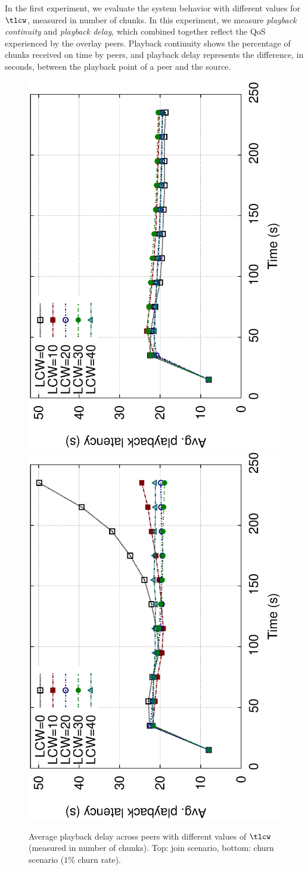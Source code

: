 {In the first experiment, we evaluate the system behavior with different values
for $\tlcw$, measured in number of chunks. In this experiment, we measure {\em
playback continuity} and {\em playback delay}, which combined together reflect
the QoS experienced by the overlay peers. Playback continuity shows the
percentage of chunks received on time by peers, and playback delay represents
the difference, in seconds, between the playback point of a peer and the
source.
\begin{figure}[t]
\centering
\includegraphics[angle=270, width=0.47\columnwidth,]{fig-pl-join}\label{fig:pl-join} 
\includegraphics[angle=270, width=0.47\columnwidth,]{fig-pl-churn}\label{fig:pl-churn}
\caption{\small Average playback delay across peers with different values of $\tlcw$ (measured in number of chunks). Top: join scenario, bottom: churn scenario ($1\%$ churn rate).}
\label{fig:pl}
\end{figure}

}

